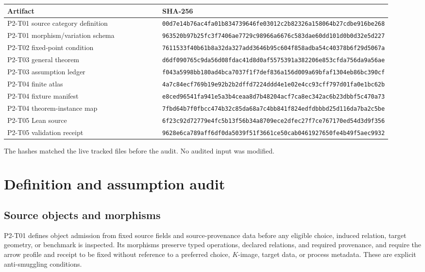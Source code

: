 \documentclass[11pt]{article}
\begin{document}
\begin{longtable}{p{0.50\linewidth}p{0.42\linewidth}}
\toprule
Artifact & SHA-256 \\
\midrule
P2-T01 source category definition &
\texttt{00d7e14b76ac4fa01b834739646fe03012c2b82326a158064b27cdbe916be268} \\
P2-T01 morphism/variation schema &
\texttt{963520b97b25fc3f7406ae7729c98966a6676c583dae60dd101d0b0d32e5d227} \\
P2-T02 fixed-point condition &
\texttt{7611533f40b61b8a32da327add3646b95c604f858adba54c40378b6f29d5067a} \\
P2-T03 general theorem &
\texttt{d6df090765c9da56d08fdac41d8d0af5575391a382206e853cfda756da9a56ae} \\
P2-T03 assumption ledger &
\texttt{f043a5998bb180ad4bca7037f1f7def836a156d009a69bfaf1304eb86bc390cf} \\
P2-T04 finite atlas &
\texttt{4a7c84ecf769b19e92b2b2dffd7224ddd4e1e02e4cc93cff797d01fa0e1bc62b} \\
P2-T04 fixture manifest &
\texttt{e8ced96541fa941e5a3b4ceaa8d7b48204acf7ca8ec342ac6b23dbbf5c470a73} \\
P2-T04 theorem-instance map &
\texttt{7fbd64b7f0fbcc474b32c85da68a7c4bb841f824edfdbbbd25d116da7ba2c5be} \\
P2-T05 Lean source &
\texttt{6f23c92d72779e4fc5b13f56b34a8709ece2dfec27f7ce767170ed54d3d9f356} \\
P2-T05 validation receipt &
\texttt{9628e6ca789aff6df0da5039f51f3661ce50cab0461927650fe4b49f5aec9932} \\
\bottomrule
\end{longtable}

The hashes matched the live tracked files before the audit.  No audited input
was modified.

\section{Definition and assumption audit}

\subsection{Source objects and morphisms}

P2-T01 defines object admission from fixed source fields and source-provenance
data before any eligible choice, induced relation, target geometry, or
benchmark is inspected.  Its morphisms preserve typed operations, declared
relations, and required provenance, and require the arrow profile and receipt
to be fixed without reference to a preferred choice, \(K\)-image, target data,
or process metadata.  These are explicit anti-smuggling conditions.
\end{document}
